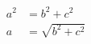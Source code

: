 \documentclass{beamer}
\begin{document}
\begin{frame}
    \begin{align*}
        a^2 &= b^2 + c^2 \\
        a &= \sqrt{b^2 + c^2}
    \end{align*}
\end{frame}
\end{document}
